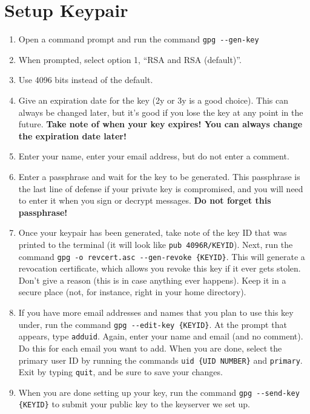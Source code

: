 \documentclass{article}
\begin{document}
\section*{Setup Keypair}

\begin{enumerate}
\item Open a command prompt and run the command \texttt{gpg -{}-gen-key}
\item When prompted, select option 1, ``RSA and RSA (default)''.
\item Use 4096 bits instead of the default.
\item Give an expiration date for the key (2y or 3y is a good choice).
  This can always be changed later, but it's good if you lose the key
  at any point in the future.  \textbf{Take note of when your key
    expires!  You can always change the expiration date later!}
\item Enter your name, enter your email address, but do not enter a
  comment.
\item Enter a passphrase and wait for the key to be generated.  This
  passphrase is the last line of defense if your private key is
  compromised, and you will need to enter it when you sign or decrypt
  messages.  \textbf{Do not forget this passphrase!}
\item Once your keypair has been generated, take note of the key ID
  that was printed to the terminal (it will look like \texttt{pub
    4096R/KEYID}).  Next, run the command \texttt{gpg -o revcert.asc
    -{}-gen-revoke \{KEYID\}}.  This will generate a revocation
  certificate, which allows you revoke this key if it ever gets
  stolen.  Don't give a reason (this is in case anything ever
  happens).  Keep it in a secure place (not, for instance, right in
  your home directory).
\item If you have more email addresses and names that you plan to use
  this key under, run the command \texttt{gpg -{}-edit-key \{KEYID\}}.
  At the prompt that appears, type \texttt{adduid}.  Again, enter your
  name and email (and no comment).  Do this for each email you want to
  add.  When you are done, select the primary user ID by running the
  commands \texttt{uid \{UID NUMBER\}} and \texttt{primary}.  Exit by
  typing \texttt{quit}, and be sure to save your changes.
\item When you are done setting up your key, run the command
  \texttt{gpg -{}-send-key \{KEYID\}} to submit your public key to the
  keyserver we set up.
\end{enumerate}
\end{document}
